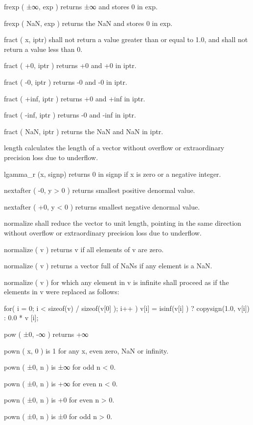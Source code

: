 frexp ( ±∞, exp ) returns ±∞ and stores 0 in exp.\par
frexp ( NaN, exp ) returns the NaN and stores 0 in exp.\par

fract ( x, iptr) shall not return a value greater than or equal to 1.0,
and shall not return a value less than 0.\par

fract ( +0, iptr ) returns +0 and +0 in iptr.\par
fract ( -0, iptr ) returns -0 and -0 in iptr.\par
fract ( +inf, iptr ) returns +0 and +inf in iptr.\par
fract ( -inf, iptr ) returns -0 and -inf in iptr.\par
fract ( NaN, iptr ) returns the NaN and NaN in iptr.\par

length calculates the length of a vector without overflow or extraordinary precision loss
due to underflow.\par

lgamma_r (x, signp) returns 0 in signp if x is zero or a negative integer.\par

nextafter ( -0, y > 0 ) returns smallest positive denormal value.\par
nextafter ( +0, y < 0 ) returns smallest negative denormal value.\par

normalize shall reduce the vector to unit length, pointing in the same direction without
overflow or extraordinary precision loss due to underflow.\par
normalize ( v ) returns v if all elements of v are zero.\par
normalize ( v ) returns a vector full of NaNs if any element is a NaN.\par
normalize ( v ) for which any element in v is infinite shall proceed as if the elements in v
were replaced as follows:\par
\startclc
for( i = 0; i < sizeof(v) / sizeof(v[0] ); i++ )
	v[i] = isinf(v[i] ) ? copysign(1.0, v[i]) : 0.0 * v [i];
\stopclc

pow ( ±0, -∞ ) returns +∞\par

pown ( x, 0 ) is 1 for any x, even zero, NaN or infinity.\par
pown ( ±0, n ) is ±∞ for odd n < 0.\par
pown ( ±0, n ) is +∞ for even n < 0.\par
pown ( ±0, n ) is +0 for even n > 0.\par
pown ( ±0, n ) is ±0 for odd n > 0.\par

